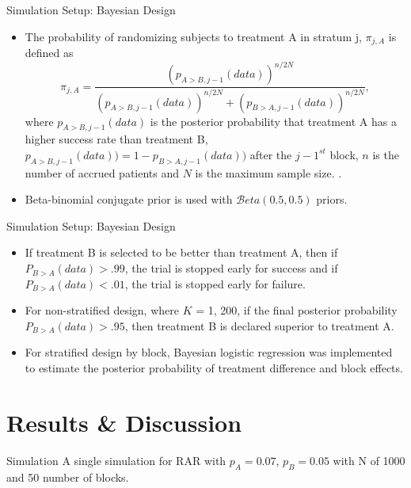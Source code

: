 \documentclass[12pt,t]{beamer}
\newcommand{\bi}{\begin{itemize}}
\newcommand{\ei}{\end{itemize}}
\newcommand{\ig}{\includegraphics}
\begin{document}
\begin{frame}{Simulation Setup: Bayesian Design}
\bi
\itemsep12pt
\item The probability of randomizing subjects to treatment A in stratum j, $\pi_{j, A}$ is defined as
$$\pi_{j, A} = \frac{(p_{A>B, j - 1} (data))^ {n/2N}}{(p_{A>B, j - 1} (data))^ {n/2N} + (p_{B>A, j - 1} (data))^ {n/2N}},$$
where $p_{A > B, j - 1}(data)$ is the posterior probability that treatment A has a higher success rate than  treatment B, $p_{A>B, j - 1} (data)) = 1 - p_{B>A, j - 1} (data))$ after the $j - 1 ^{st}$ block, $n$ is the number of accrued patients and $N$ is the maximum sample size. . 
\item Beta-binomial conjugate prior is used with $\mathcal{B}eta(0.5, 0.5)$ priors.
\ei
\end{frame}

\begin{frame}{Simulation Setup: Bayesian Design}
\bi
\itemsep12pt
\item If treatment B is selected to be better than treatment A, then if $P_{B > A}(data) > .99$, the trial is stopped early for success and if $P_{B>A}(data) < .01$, the trial is stopped early for failure. 
\item For non-stratified design, where $K$ = 1, 200, if the final posterior probability $P_{B > A}(data) > .95$, then treatment B is declared superior to treatment A. 
\item For stratified design by block, Bayesian logistic regression was implemented to estimate the posterior probability of treatment difference and block effects. 
\ei
\end{frame}

\section{Results \& Discussion}


\begin{frame}{Simulation}
A single simulation for RAR with $p_A = 0.07$, $p_B = 0.05$ with N of 1000 and 50 number of blocks.
\vspace{6pt}

\centerline{
        }

 
    
\end{frame}
\end{document}
